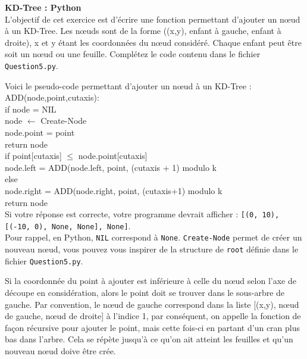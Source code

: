 \newpage

\begin{Exercice}[15 minutes]\textbf{KD-Tree : Python}\\

L'objectif de cet exercice est d'écrire une fonction permettant d'ajouter un nœud à un KD-Tree. Les nœuds sont de la forme ((x,y), enfant à gauche, enfant à droite), x et y étant les coordonnées du nœud considéré. Chaque enfant peut être soit un nœud ou une feuille. Complétez le code contenu dans le fichier \lstinline{Question5.py}.\\

\begin{conseil}


Voici le pseudo-code permettant d'ajouter un nœud à un KD-Tree :\\

ADD(node,point,cutaxis):\\
    \tabto{1cm}if node = NIL\\
        \tabto{2cm}node $\leftarrow$ Create-Node\\
        \tabto{2cm}node.point = point\\
        \tabto{2cm}return node\\
    \tabto{1cm}if point[cutaxis] $\leq$ node.point[cutaxis]\\
    \tabto{2cm} node.left = ADD(node.left, point, (cutaxis + 1) modulo k\\
    \tabto{1cm} else\\
    \tabto{2cm} node.right = ADD(node.right, point, (cutaxis+1) modulo k\\
    \tabto{1cm} return node\\
    
    Si votre réponse est correcte, votre programme devrait afficher : \lstinline{[(0, 10), [(-10, 0), None, None], None]}.\\
    Pour rappel, en Python, \lstinline{NIL} correspond à \lstinline{None}. \lstinline{Create-Node} permet de créer un nouveau nœud, vous pouvez vous inspirer de la structure de \lstinline{root} définie dans le fichier \lstinline{Question5.py}.
\end{conseil}

\begin{solution}


Si la coordonnée du point à ajouter est inférieure à celle du nœud selon l'axe de découpe en considération, alors le point doit se trouver dans le sous-arbre de gauche. Par convention, le nœud de gauche correspond dans la liste [(x,y), nœud de gauche, nœud de droite] à l'indice 1, par conséquent, on appelle la fonction de façon récursive pour ajouter le point, mais cette fois-ci en partant d'un cran plus bas dans l'arbre. Cela se répète jusqu'à ce qu'on ait atteint les feuilles et qu'un nouveau nœud doive être crée.

\end{solution}
\end{Exercice}

